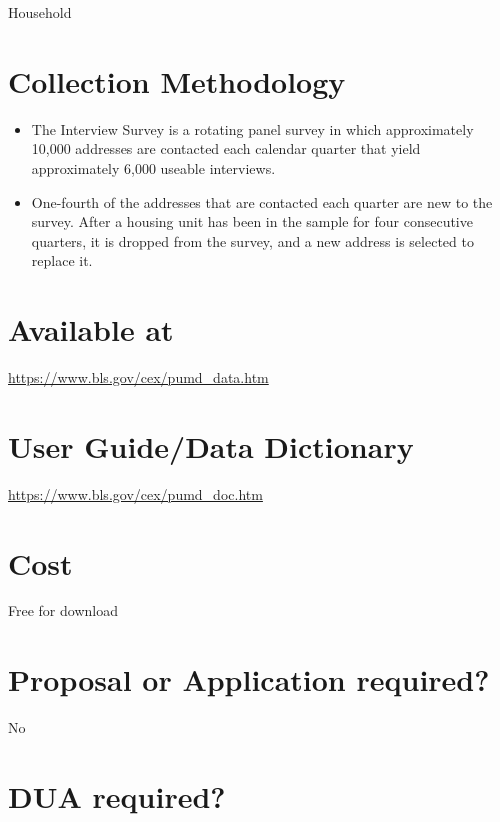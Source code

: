 \documentclass[
]{book}
\providecommand{\tightlist}{%
  \setlength{\itemsep}{0pt}\setlength{\parskip}{0pt}}
\begin{document}
Household

\hypertarget{collection-methodology-19}{%
\section{Collection Methodology}\label{collection-methodology-19}}

\begin{itemize}
\tightlist
\item
  The Interview Survey is a rotating panel survey in which approximately 10,000 addresses are contacted each calendar quarter that yield approximately 6,000 useable interviews.
\item
  One-fourth of the addresses that are contacted each quarter are new to the survey. After a housing unit has been in the sample for four consecutive quarters, it is dropped from the survey, and a new address is selected to replace it.
\end{itemize}

\hypertarget{available-at-19}{%
\section{Available at}\label{available-at-19}}

\url{https://www.bls.gov/cex/pumd_data.htm}

\hypertarget{user-guidedata-dictionary-19}{%
\section{User Guide/Data Dictionary}\label{user-guidedata-dictionary-19}}

\url{https://www.bls.gov/cex/pumd_doc.htm}

\hypertarget{cost-19}{%
\section{Cost}\label{cost-19}}

Free for download

\hypertarget{proposal-or-application-required-19}{%
\section{Proposal or Application required?}\label{proposal-or-application-required-19}}

No

\hypertarget{dua-required-19}{%
\section{DUA required?}\label{dua-required-19}}
\end{document}
